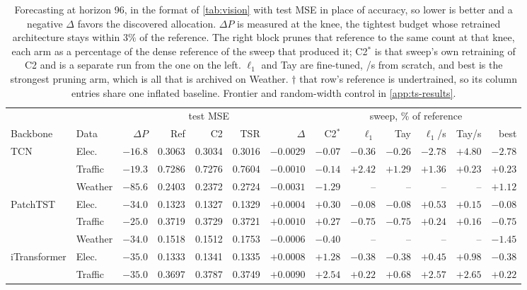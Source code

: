 \documentclass[10pt]{article}
\theoremstyle{paper}
\begin{document}
\begin{table}[t]
\centering
\caption{Forecasting at horizon 96, in the format of \cref{tab:vision} with test MSE in place of accuracy, so lower is better and a negative $\Delta$ favors the discovered allocation. $\Delta P$ is measured at the knee, the tightest budget whose retrained architecture stays within $3\%$ of the reference. The right block prunes that reference to the same count at that knee, each arm as a percentage of the dense reference of the sweep that produced it; C2$^{\ast}$ is that sweep's own retraining of C2 and is a separate run from the one on the left. $\ell_1$ and Tay are fine-tuned, /s from scratch, and best is the strongest pruning arm, which is all that is archived on Weather. $\dagger$ that row's reference is undertrained, so its column entries share one inflated baseline. Frontier and random-width control in \cref{app:ts-results}.}
\label{tab:timeseries}
\scriptsize
\setlength{\tabcolsep}{2.2pt}
\begin{tabular}{@{}llrrrrrrrrrrr@{}}
\toprule
& & & \multicolumn{3}{c}{test MSE} & & \multicolumn{6}{c}{sweep, \% of reference} \\
\cmidrule(lr){4-6}\cmidrule(lr){8-13}
Backbone & Data & $\Delta P$ & Ref & C2 & TSR & $\Delta$ & C2$^{\ast}$ & $\ell_1$ & Tay & $\ell_1$/s & Tay/s & best \\
\midrule
TCN        & Elec.  & $-16.8$ & 0.3063 & 0.3034 & 0.3016 & $-0.0029$ & $-0.07$ & $-0.36$ & $-0.26$ & $-2.78$ & $+4.80$ & $-2.78$ \\
           & Traffic& $-19.3$ & 0.7286 & 0.7276 & 0.7604 & $-0.0010$ & $-0.14$ & $+2.42$ & $+1.29$ & $+1.36$ & $+0.23$ & $+0.23$ \\
           & Weather& $-85.6$ & 0.2403 & 0.2372 & 0.2724 & $-0.0031$ & $-1.29$ & -- & -- & -- & -- & $+1.12$ \\
\midrule
PatchTST   & Elec.  & $-34.0$ & 0.1323 & 0.1327 & 0.1329 & $+0.0004$ & $+0.30$ & $-0.08$ & $-0.08$ & $+0.53$ & $+0.15$ & $-0.08$ \\
           & Traffic& $-25.0$ & 0.3719 & 0.3729 & 0.3721 & $+0.0010$ & $+0.27$ & $-0.75$ & $-0.75$ & $+0.24$ & $+0.16$ & $-0.75$ \\
           & Weather& $-34.0$ & 0.1518 & 0.1512 & 0.1753 & $-0.0006$ & $-0.40$ & -- & -- & -- & -- & $-1.45$ \\
\midrule
iTransformer& Elec. & $-35.0$ & 0.1333 & 0.1341 & 0.1335 & $+0.0008$ & $+1.28$ & $-0.38$ & $-0.38$ & $+0.45$ & $+0.98$ & $-0.38$ \\
           & Traffic& $-35.0$ & 0.3697 & 0.3787 & 0.3749 & $+0.0090$ & $+2.54$ & $+0.22$ & $+0.68$ & $+2.57$ & $+2.65$ & $+0.22$ \\

\end{tabular}
\end{table}
\end{document}
